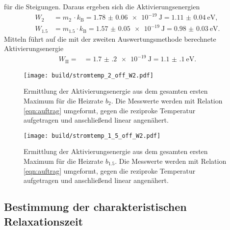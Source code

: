 für die Steigungen. Daraus ergeben sich die Aktivierungsenergien
\begin{align}
  W_{2} &= m_{2} \, \cdot k_\text{B} = \SI{1.78(6)e-19}{\joule} = \SI{1.11(4)}{\electronvolt}, \\
  W_{1.5} &= m_{1.5} \cdot k_\text{B} = \SI{1.57(5)e-19}{\joule} = \SI{0.98(3)}{\electronvolt}.
\end{align}
Mitteln führt auf die mit der zweiten Auswertungsmethode berechnete Aktivierungsenergie
\begin{align}
  W_{\text{II}} = &= \SI{1.7(2)e-19}{\joule} = \SI{1.1(1)}{\electronvolt}.
\label{eqn:akt2}
\end{align}

\begin{figure}
  \centering
  \texttt{[image: build/stromtemp\_2\_off\_W2.pdf]}
  \caption{Ermittlung der Aktivierungsenergie aus dem gesamten ersten Maximum für die Heizrate $b_{2}$. Die Messwerte
  werden mit Relation \eqref{eqn:auftrag} umgeformt, gegen die reziproke Temperatur aufgetragen und anschließend
  linear angenähert.}
  \label{fig:messwerte2offW2}
\end{figure}

\begin{figure}
  \centering
  \texttt{[image: build/stromtemp\_1\_5\_off\_W2.pdf]}
  \caption{Ermittlung der Aktivierungsenergie aus dem gesamten ersten Maximum für die Heizrate $b_{1.5}$. Die Messwerte
  werden mit Relation \eqref{eqn:auftrag} umgeformt, gegen die reziproke Temperatur aufgetragen und anschließend
  linear angenähert.}
  \label{fig:messwerte15offW2}
\end{figure}

\subsection{Bestimmung der charakteristischen Relaxationszeit}

